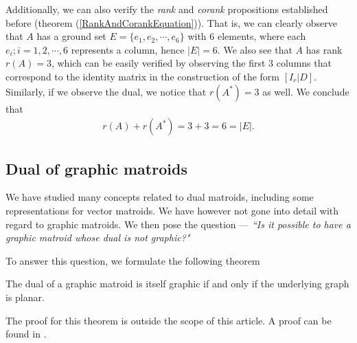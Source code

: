 \begin{exmp}
    Additionally, we can also verify the \textit{rank} and \textit{corank} propositions established before (theorem (\ref{RankAndCorankEquation})). That is, we can clearly observe that $A$ has a ground set $E=\{e_1, e_2, \cdots, e_6\}$ with $6$ elements, where each $e_i; i =1,2, \cdots,6$ represents a column, hence $|E|=6$. We also see that $A$ has rank $r(A)=3$, which can be easily verified by observing the first $3$ columns that correspond to the identity matrix in the construction of the form $[I_r|D]$. Similarly, if we observe the dual, we notice that $r(A^*)=3$ as well. We conclude that 
    \begin{align*}
    r(A)+r(A^*)= 3 + 3 = 6 = |E|.
    \end{align*}
\end{exmp}

%

\subsection{Dual of graphic matroids}
We have studied many concepts related to dual matroids, including some representations for vector matroids. We have however not gone into detail with regard to graphic matroids. We then pose the question --- \textit{``Is it possible to have a graphic matroid whose dual is not graphic?"}

To answer this question, we formulate the following theorem

\begin{theorem}
    The dual of a graphic matroid is itself graphic if and only if the underlying graph is planar.
\end{theorem}

The proof for this theorem is outside the scope of this article. A proof can be found in \cite[section 2.4]{oxley1}.

